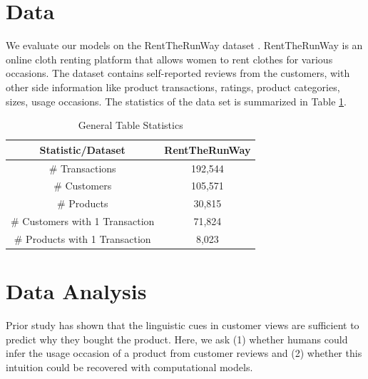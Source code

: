 \documentclass[sigconf]{acmart}
\begin{document}
\section{Data}


We evaluate our models on the RentTheRunWay dataset \cite{10.1145/3240323.3240398}. RentTheRunWay is an online cloth renting platform that allows women to rent clothes for various occasions. The dataset contains self-reported reviews from the customers, with other side information like product transactions, ratings, product categories, sizes, usage occasions. The statistics of the data set is summarized in Table \ref{table:gen-stats}.

\begin{table}[htbp]
\centering
\begin{tabular}{cc}
Statistic/Dataset               & RentTheRunWay \\
\hline
\# Transactions                 & 192,544       \\
\# Customers                    & 105,571       \\
\# Products                     & 30,815        \\
\# Customers with 1 Transaction & 71,824        \\
\# Products with 1 Transaction  & 8,023  

\end{tabular}
\caption{General Table Statistics\label{table:gen-stats}}
\end{table}

\section{Data Analysis}

Prior study has shown that the linguistic cues in customer views are sufficient to predict why they bought the product. Here, we ask (1) whether humans could infer the usage occasion of a product from customer reviews and (2) whether this intuition could be recovered with computational models.
\end{document}
